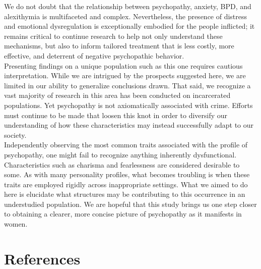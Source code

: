 \documentclass[
  man,floatsintext]{apa7}
\begin{document}
We do not doubt that the relationship between psychopathy, anxiety, BPD, and alexithymia is multifaceted and complex. Nevertheless, the presence of distress and emotional dysregulation is exceptionally embodied for the people inflicted; it remains critical to continue research to help not only understand these mechanisms, but also to inform tailored treatment that is less costly, more effective, and deterrent of negative psychopathic behavior.\\
Presenting findings on a unique population such as this one requires cautious interpretation. While we are intrigued by the prospects suggested here, we are limited in our ability to generalize conclusions drawn. That said, we recognize a vast majority of research in this area has been conducted on incarcerated populations. Yet psychopathy is not axiomatically associated with crime. Efforts must continue to be made that loosen this knot in order to diversify our understanding of how these characteristics may instead successfully adapt to our society.\\
Independently observing the most common traits associated with the profile of psychopathy, one might fail to recognize anything inherently dysfunctional. Characteristics such as charisma and fearlessness are considered desirable to some. As with many personality profiles, what becomes troubling is when these traits are employed rigidly across inappropriate settings. What we aimed to do here is elucidate what structures may be contributing to this occurrence in an understudied population. We are hopeful that this study brings us one step closer to obtaining a clearer, more concise picture of psychopathy as it manifests in women.

\newpage

\hypertarget{references}{%
\section{References}\label{references}}
\end{document}
